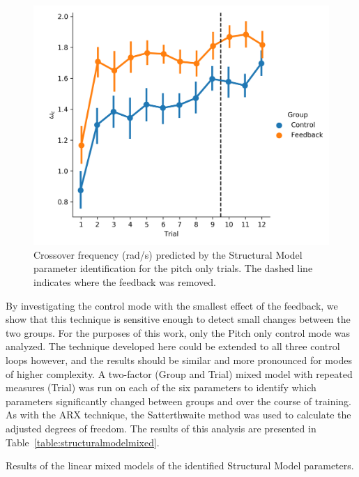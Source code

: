 \begin{figure}[tb]
    \centering
    \includegraphics[width=0.8\linewidth]{figures/Modeling/wc_group.png}
    \caption[Crossover frequency (Structural Model)]{Crossover frequency (rad/s) predicted by the Structural Model parameter identification for the pitch only trials.
        The dashed line indicates where the feedback was removed.}
    \label{fig:sm_crossover}
\end{figure}

By investigating the control mode with the smallest effect of the feedback, we show that this technique is sensitive enough to detect small changes between the two groups.
For the purposes of this work, only the Pitch only control mode was analyzed.
The technique developed here could be extended to all three control loops however, and the results should be similar and more pronounced for modes of higher complexity.
A two-factor (Group and Trial) mixed model with repeated measures (Trial) was run on each of the six parameters to identify which parameters significantly changed between groups and over the course of training.
As with the ARX technique, the Satterthwaite method was used to calculate the adjusted degrees of freedom.
The results of this analysis are presented in Table~\ref{table:structuralmodelmixed}.

\begin{table}[b]
    \centering
    \caption[Results of the linear mixed models of the identified Structural Model parameters]{Results of the linear mixed models of the identified Structural Model parameters.}
    \label{table:structuralmodelmixed}
\end{table}

